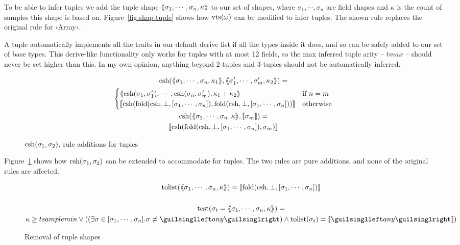 To be able to infer tuples we add the tuple shape $\langle\kern-0.25em\langle  \sigma_1, \cdots, \sigma_n, \kappa  \rangle\kern-0.25em\rangle$ to our set of shapes, where $ \sigma_1, \cdots, \sigma_n $ are field shapes and $\kappa$ is the count of samples this shape is based on. Figure~\ref{fig:shap-tuple} shows how $\operatorname{vts}(\omega)$ can be modified to infer tuples. The shown rule replaces the original rule for ‹Array›.

A tuple automatically implements all the traits in our default derive list if all the types inside it does\cite[primitive std::tuple]{rust-std-docs}, and so can be safely added to our set of base types. This derive-like functionality only works for tuples with at most 12 fields, so the max inferred tuple arity -- $tmax$ -- should never be set higher than this. In my own opinion, anything beyond 2-tuples and 3-tuples should not be automatically inferred.

\begin{figure}[ht!]
\begin{gather*}
\operatorname{csh}(\langle\kern-0.25em\langle  \sigma_1, \cdots, \sigma_n, \kappa_1  \rangle\kern-0.25em\rangle, \langle\kern-0.25em\langle  \sigma'_1, \cdots, \sigma'_m, \kappa_2  \rangle\kern-0.25em\rangle) = \\
\begin{cases}
  \langle\kern-0.25em\langle  \operatorname{csh}(\sigma_1, \sigma'_1), \cdots, \operatorname{csh}(\sigma_n, \sigma'_m), \kappa_1 + \kappa_2  \rangle\kern-0.25em\rangle   &  \text{if } n = m \\
  \llbracket  \operatorname{csh}(\operatorname{fold}(\operatorname{csh}, \bot, [\sigma_1, \cdots, \sigma_n]), \operatorname{fold}(\operatorname{csh}, \bot, [\sigma_1, \cdots, \sigma_n]))  \rrbracket & \text{otherwise}
\end{cases} \\
\operatorname{csh}(\langle\kern-0.25em\langle  \sigma_1, \cdots, \sigma_n, \kappa  \rangle\kern-0.25em\rangle, \llbracket \sigma_m \rrbracket) = \\
\llbracket \operatorname{csh}(\operatorname{fold}(\operatorname{csh}, \bot, [\sigma_1, \cdots, \sigma_n]), \sigma_m) \rrbracket
\end{gather*}
\caption{$\operatorname{csh}(\sigma_1, \sigma_2)$, rule additions for tuples}
\label{fig:csh-tuple}
\end{figure}

Figure~\ref{fig:csh-tuple} shows how $\operatorname{csh}(\sigma_1, \sigma_2)$ can be extended to accommodate for tuples. The two rules are pure additions, and none of the original rules are affected.


\begin{figure}[ht!]
\begin{gather*}
\text{tolist}(\tupl{ \sigma_1, \cdots, \sigma_n, \kappa }) = \vect{\fold(\csh, \bot, [\sigma_1, \cdots, \sigma_n])} \\ \\
\text{test}(\sigma_t = \tupl{ \sigma_1, \cdots, \sigma_n, \kappa })  = \\
\kappa \geq tsamplemin \lor ((\exists \sigma \in [\sigma_1, \cdots, \sigma_n] . \sigma \neq ‹any›) \land \text{tolist}(\sigma_t) = \vect{‹any›})
\end{gather*}
\caption{Removal of tuple shapes}
\label{fig:remove-tuple}
\end{figure}

